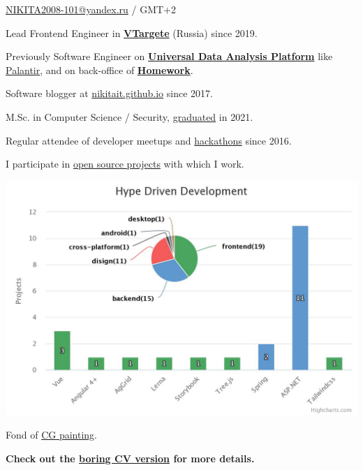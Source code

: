 \documentclass{yb}
\begin{document}
\ybPrintPhoto{}

{\scshape\bfseries\Large {}}\newline
\href{mailto:NIKITA2008-101@yandex.ru}{NIKITA2008-101@yandex.ru} / GMT+2

\vspace*{1em}

Lead Frontend Engineer in \href{https://vtargete.ru/}{\textbf{VTargete}} (Russia) \newline
since 2019.

\vspace*{1em}

Previously Software Engineer on \textbf{\href{https://baltinfocom.ru/BigData\#en}{Universal Data Analysis Platform}} like \href{https://www.palantir.com/}{Palantir}, and on back-office of \textbf{\href{https://homework.ru}{Homework}}.

Software blogger at \href{https://nikitait.github.io/}{nikitait.github.io} since 2017.

M.Sc. in Computer Science / Security, \href{https://etu.ru/en/university/}{graduated} in 2021.

Regular attendee of developer meetups and \href{https://www.youtube.com/watch?v=gVKDU043EWI&t=1s&ab_channel=EPAMSaint-Petersburg}{hackathons} since 2016.

I participate in \href{https://github.com/nikitait}{open source projects} with which I work.

\includegraphics[width=\textwidth]{./hype-driven-development.jpeg}

Fond of \href{https://www.artstation.com/nikitait}{CG painting}.

\textbf{Check out the \href{https://texlive2020.latexonline.cc/compile?git=https://github.com/NikitaIT/cv&target=resume-boring.tex&command=pdflatex}{boring CV version} for more details.}
\end{document}
